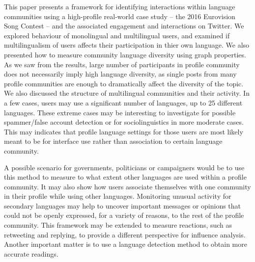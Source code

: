 \documentclass{llncs}
\begin{document}
This paper presents a framework for identifying interactions within
language communities using a high-profile real-world case study --
the 2016 Eurovision Song Contest -- and the associated engagement and
interactions on Twitter. We explored behaviour of monolingual and multilingual 
users, and examined if multilingualism of users affects their participation in 
thier own language. We also presented how to measure 
community language diversity using graph properties. As we saw from the results,
large number of participants in profile community does not necessarily 
imply high language diversity, as single posts from many profile communities 
are enough to dramatically affect the diversity of the topic. 
We also discussed the structure of multilingual communities and their 
activity. In a few cases, users may use a significant number of languages, up to 25
different languages. These extreme cases may be interesting to
investigate for possible spammer/false account detection or for
sociolinguistics in more moderate cases. This may indicates that profile 
language settings for those users are most likely meant to be for interface 
use rather than association to certain language community.


A possible scenario for governments, politicians or campaigners would be
to use this method to measure to what extent other languages are used
within a profile community. It may also show how users associate
themselves with one community in their profile while using other
languages. Monitoring unusual activity for secondary languages may
help to uncover important messages or opinions that could not be
openly expressed, for a variety of reasons, to the rest of the profile
community. This framework may be extended to measure reactions,
such as retweeting and replying, to provide a different perspective 
for influence analysis. Another important matter is to use a language 
detection method to obtain more accurate readings.





\end{document}
